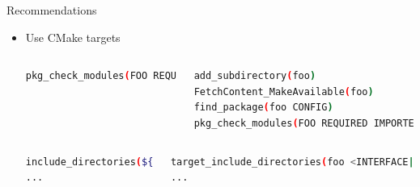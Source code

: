 \documentclass{beamer}
\begin{document}

\begin{frame}[fragile]{Recommendations}\small%
	\begin{itemize}
		\item Use CMake targets%
			\begin{columns}
				\begin{lstlisting}[language=sh]
pkg_check_modules(FOO REQUIRED foo)
				\end{lstlisting}%
				\begin{lstlisting}[language=sh]
add_subdirectory(foo)
FetchContent_MakeAvailable(foo)
find_package(foo CONFIG)
pkg_check_modules(FOO REQUIRED IMPORTED_TARGET foo)
				\end{lstlisting}%
			\end{columns}
			\begin{columns}
				\begin{lstlisting}[language=sh]
include_directories(${utils_INCLUDE_DIRS})
...
				\end{lstlisting}%
				\begin{lstlisting}[language=sh]
target_include_directories(foo <INTERFACE|PUBLIC|PRIVATE> ${utils_INCLUDE_DIRS})
...
				\end{lstlisting}%
			\end{columns}
	\end{itemize}
\end{frame}
\end{document}
